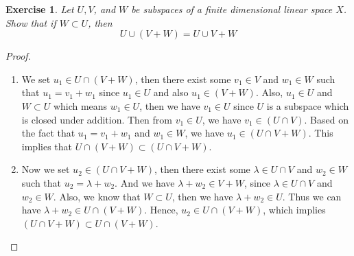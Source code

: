 \documentclass[11pt]{book}
\newtheorem{exercise}{Exercise}[section]
\theoremstyle{definition}
\numberwithin{equation}{chapter}
\begin{document}
\medskip

\begin{exercise}\label{ex_3}
Let $U, V$, and $W$ be subspaces of a finite dimensional linear space $X$. Show that if $W\subset U$, then 
$$U\cup (V + W) = U\cup V + W$$
\end{exercise}
\begin{proof}
~\begin{enumerate}[label=(\alph*)]
    \item We set $u_1 \in U \cap (V+W)$, then there exist some $v_1 \in V$ and $w_1 \in W$ such that $u_1 = v_1 + w_1$ since $u_1 \in U$ and also $u_1 \in (V+W)$. Also, $u_1 \in U$ and $W \subset U$ which means $w_1 \in U$, then we have $v_1 \in U$ since $U$ is a subspace which is closed under addition. Then from $v_1 \in U$, we have $v_1 \in (U \cap V)$. Based on the fact that $u_1 = v_1 + w_1$ and $w_1 \in W$, we have $u_1 \in (U \cap V + W)$. This implies that $U \cap (V+W) \subset (U \cap V + W)$.
    \item Now we set $u_2 \in (U \cap V + W)$, then there exist some $\lambda \in U \cap V$ and $w_2 \in W$ such that $u_2 = \lambda + w_2$. And we have $\lambda + w_2 \in V+W$, since $\lambda \in U \cap V$ and $w_2 \in W$. Also, we know that $W \subset U$, then we have $\lambda + w_2 \in U$. Thus we can have $\lambda + w_2 \in U \cap (V+W)$. Hence, $u_2 \in U \cap (V+W)$, which implies $(U \cap V + W) \subset U \cap (V+W)$.
\end{enumerate}
\end{proof}

\medskip
\end{document}
